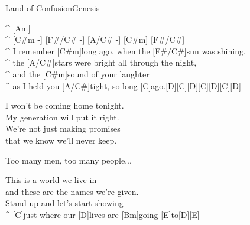 \begin{song}{Land of Confusion}{Genesis}
\begin{guitar}
^ [Am]\\

^ [C#m -] [F#/C# -] [A/C# -] [C#m] [F#/C#]\\

^ I remember [C#m]long ago, when the [F#/C#]sun was shining,\\
^ the [A/C#]stars were bright all through the night,\\
^ and the [C#m]sound of your laughter\\
^ as I held you [A/C#]tight, so long [C]ago.[D][C][D][C][D][C][D]\\
\end{guitar}

\begin{guitar}
I won't be coming home tonight.\\
My generation will put it right.\\
We're not just making promises\\
that we know we'll never keep.\\
\end{guitar}


\begin{guitar}
Too many men, too many people...\\
\end{guitar}

\newpage
\begin{guitar}
This is a world we live in\\
and these are the names we're given.\\
Stand up and let's start showing\\
^ [C]just where our [D]lives are [Bm]going [E]to[D][E]\\
\end{guitar}

\end{song}
